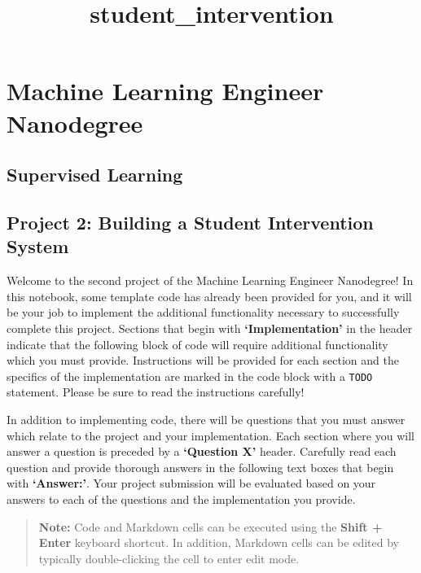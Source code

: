 \documentclass{ctexart}
\title{student\_intervention}
\begin{document}
    
    
    \maketitle
    
    

    
    \section{Machine Learning Engineer
Nanodegree}\label{machine-learning-engineer-nanodegree}

\subsection{Supervised Learning}\label{supervised-learning}

\subsection{Project 2: Building a Student Intervention
System}\label{project-2-building-a-student-intervention-system}

    Welcome to the second project of the Machine Learning Engineer
Nanodegree! In this notebook, some template code has already been
provided for you, and it will be your job to implement the additional
functionality necessary to successfully complete this project. Sections
that begin with \textbf{`Implementation'} in the header indicate that
the following block of code will require additional functionality which
you must provide. Instructions will be provided for each section and the
specifics of the implementation are marked in the code block with a
\texttt{\textquotesingle{}TODO\textquotesingle{}} statement. Please be
sure to read the instructions carefully!

In addition to implementing code, there will be questions that you must
answer which relate to the project and your implementation. Each section
where you will answer a question is preceded by a \textbf{`Question X'}
header. Carefully read each question and provide thorough answers in the
following text boxes that begin with \textbf{`Answer:'}. Your project
submission will be evaluated based on your answers to each of the
questions and the implementation you provide.

\begin{quote}
\textbf{Note:} Code and Markdown cells can be executed using the
\textbf{Shift + Enter} keyboard shortcut. In addition, Markdown cells
can be edited by typically double-clicking the cell to enter edit mode.
\end{quote}
\end{document}

